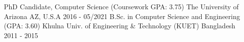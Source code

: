 

\begin{cventries}

  \cventry
    {PhD Candidate, Computer Science (Coursework GPA: 3.75)} %
    {The University of Arizona} %
    {AZ, U.S.A} %
    {2016 - 05/2021} %
    {}
    {}
  \vspace*{-2mm}
  \cventry
    {B.Sc. in Computer Science and Engineering (GPA: 3.60)} %
    {Khulna Univ. of Engineering \& Technology (KUET)} %
    {Bangladesh} %
    {2011 - 2015} %
    {}
    {}

\end{cventries}
